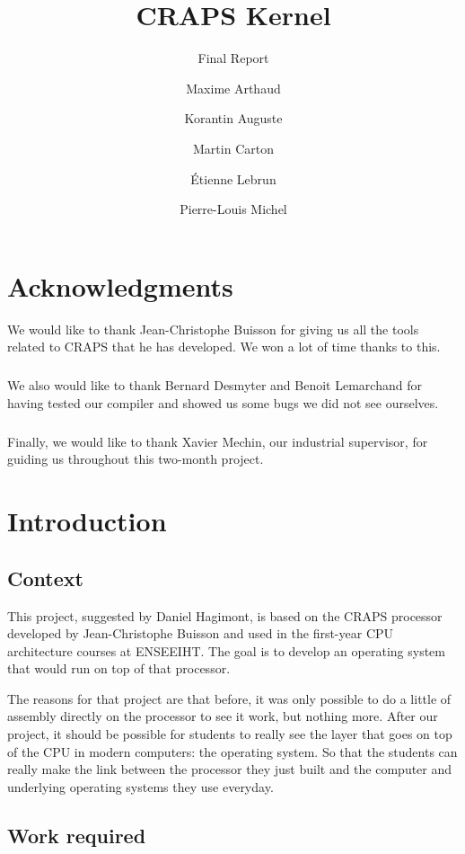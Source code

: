 \documentclass[openany]{book}
\title{CRAPS Kernel}
\subtitle{Final Report}
\author{
       Maxime Arthaud
  \and Korantin Auguste
  \and Martin Carton
  \and Étienne Lebrun
  \and Pierre-Louis Michel
}
\begin{document}
  

  \chapter*{Acknowledgments}
    We would like to thank Jean-Christophe Buisson for giving us all the tools
    related to CRAPS that he has developed. We won a lot of time thanks to this.

    \paragraph{}
    We also would like to thank Bernard Desmyter and Benoit Lemarchand for
    having tested our compiler and showed us some bugs we did not see ourselves.

    \paragraph{}
    Finally, we would like to thank Xavier Mechin, our industrial supervisor,
    for guiding us throughout this two-month project.

  \tableofcontents

  \chapter{Introduction}
    \section{Context}
      This project, suggested by Daniel Hagimont, is based on the CRAPS
      processor developed by Jean-Christophe Buisson and used in the first-year
      CPU architecture courses at ENSEEIHT. The goal is to develop an operating
      system that would run on top of that processor.

      The reasons for that project are that before, it was only possible to do a
      little of assembly directly on the processor to see it work, but nothing
      more.  After our project, it should be possible for students to really see
      the layer that goes on top of the CPU in modern computers: the operating
      system. So that the students can really make the link between the
      processor they just built and the computer and underlying operating
      systems they use everyday.

    \section{Work required}
\end{document}

